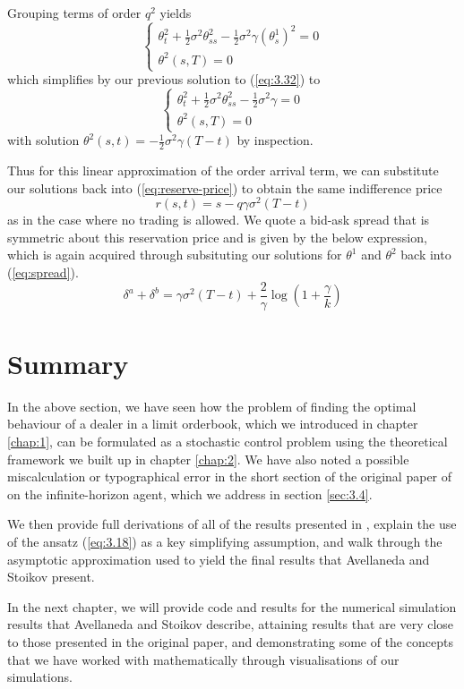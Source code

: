 Grouping terms of order $q^2$ yields
\begin{equation}
    \begin{cases}
        \theta^2_t+\frac{1}{2}\sigma^2\theta^2_{ss}-\frac{1}{2}\sigma^2\gamma(\theta^1_s)^2=0\\
        \theta^2(s,T)=0
    \end{cases}
\end{equation}
which simplifies by our previous solution to (\ref{eq:3.32}) to
\begin{equation*}
    \begin{cases}
        \theta^2_t+\frac{1}{2}\sigma^2\theta^2_{ss}-\frac{1}{2}\sigma^2\gamma=0\\
        \theta^2(s,T)=0
    \end{cases}
\end{equation*}
with solution $\theta^2(s,t)=-\frac{1}{2}\sigma^2\gamma(T-t)$ by inspection.

Thus for this linear approximation of the order arrival term, we can substitute our
solutions back into (\ref{eq:reserve-price}) to obtain the same indifference price
\begin{equation}\label{eq:3.34}
    r(s,t)=s-q\gamma\sigma^2(T-t)
\end{equation}
as in the case where no trading is allowed. We quote a bid-ask spread that is symmetric
about this reservation price and is given by the below expression, which is again acquired
through subsituting our solutions for $\theta^1$ and $\theta^2$ back into (\ref{eq:spread}).
\begin{equation}\label{eq:3.35}
    \delta^a+\delta^b=\gamma\sigma^2(T-t)+\frac{2}{\gamma}\log\left(1+\frac{\gamma}{k}\right)
\end{equation}

\section{Summary}\label{sec:3.9}

In the above section, we have seen how the problem of finding the optimal behaviour
of a dealer in a limit orderbook, which we introduced in chapter \ref{chap:1}, can be
formulated as a stochastic control problem using the theoretical framework we built up
in chapter \ref{chap:2}. We have also noted a possible miscalculation or typographical
error in the short section of the original paper of \cite{AS2008} on the infinite-horizon
agent, which we address in section \ref{sec:3.4}. 

We then provide full derivations of all of the results presented in \cite{AS2008},
explain the use of the ansatz (\ref{eq:3.18}) as a key simplifying assumption, and walk
through the asymptotic approximation used to yield the final results that Avellaneda
and Stoikov present. 

In the next chapter, we will provide code and results for the
numerical simulation results that Avellaneda and Stoikov describe, attaining results 
that are very close to those presented in the original paper, and demonstrating some
of the concepts that we have worked with mathematically through visualisations of 
our simulations.